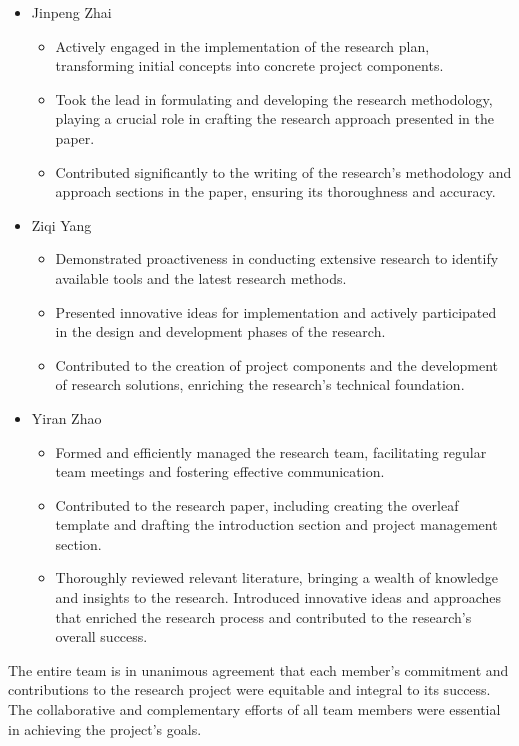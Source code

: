 \documentclass[conference]{IEEEtran}
\begin{document}
\begin{itemize}
    \item Jinpeng Zhai
    \begin{itemize}
        \item Actively engaged in the implementation of the research plan, transforming initial concepts into concrete project components.
        \item Took the lead in formulating and developing the research methodology, playing a crucial role in crafting the research approach presented in the paper.
        \item Contributed significantly to the writing of the research's methodology and approach sections in the paper, ensuring its thoroughness and accuracy.
    \end{itemize}
    \item Ziqi Yang
    \begin{itemize}
        \item Demonstrated proactiveness in conducting extensive research to identify available tools and the latest research methods.
        \item Presented innovative ideas for implementation and actively participated in the design and development phases of the research.
        \item Contributed to the creation of project components and the development of research solutions, enriching the research's technical foundation.
    \end{itemize}
    \item Yiran Zhao
    \begin{itemize}
        \item Formed and efficiently managed the research team, facilitating regular team meetings and fostering effective communication.
        \item Contributed to the research paper, including creating the overleaf template and drafting the introduction section and project management section.
        \item Thoroughly reviewed relevant literature, bringing a wealth of knowledge and insights to the research. Introduced innovative ideas and approaches that enriched the research process and contributed to the research's overall success.
    \end{itemize}
\end{itemize}

The entire team is in unanimous agreement that each member's commitment and contributions to the research project were equitable and integral to its success. The collaborative and complementary efforts of all team members were essential in achieving the project's goals.
\end{document}
